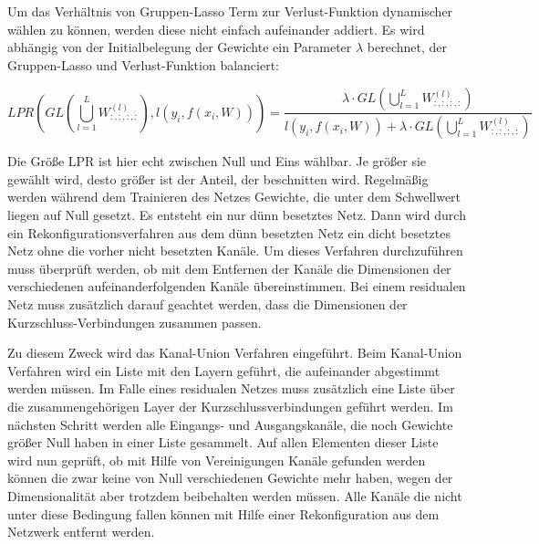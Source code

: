 Um das Verhältnis von Gruppen-Lasso Term zur Verlust-Funktion dynamischer wählen zu können, werden diese nicht einfach aufeinander addiert. Es wird abhängig von der Initialbelegung der Gewichte ein Parameter $\lambda$  berechnet, der Gruppen-Lasso und Verlust-Funktion balanciert:

\begin{equation}
 LPR(GL(\bigcup_{l=1}^{L} W_{:,:,:,:}^{(l)}),l(y_i,f(x_i,W))) = \frac{\lambda \cdot GL(\bigcup_{l=1}^{L} W_{:,:,:,:}^{(l)})}{l(y_i,f(x_i,W)) + \lambda \cdot GL(\bigcup_{l=1}^{L} W_{:,:,:,:}^{(l)})}           
\end{equation}

Die Größe LPR ist hier echt zwischen Null und Eins wählbar. Je größer sie gewählt wird, desto größer ist der Anteil, der beschnitten wird. Regelmäßig werden während dem Trainieren des Netzes Gewichte, die unter dem Schwellwert liegen auf Null gesetzt. Es entsteht ein nur dünn besetztes Netz. Dann wird durch ein Rekonfigurationsverfahren aus dem dünn besetzten Netz ein dicht besetztes Netz ohne die vorher nicht besetzten Kanäle. Um dieses Verfahren durchzuführen muss überprüft werden, ob mit dem Entfernen der Kanäle die Dimensionen der verschiedenen aufeinanderfolgenden Kanäle übereinstimmen. Bei einem residualen Netz muss zusätzlich darauf geachtet werden, dass die Dimensionen der Kurzschluss-Verbindungen zusammen passen.


Zu diesem Zweck wird das Kanal-Union Verfahren eingeführt. Beim Kanal-Union Verfahren wird ein Liste mit den Layern geführt, die aufeinander abgestimmt werden müssen. Im Falle eines residualen Netzes muss zusätzlich eine Liste über die zusammengehörigen Layer der Kurzschlussverbindungen geführt werden. Im nächsten Schritt werden alle Eingangs- und Ausgangskanäle, die noch Gewichte größer Null haben in einer Liste gesammelt. Auf allen Elementen dieser Liste wird nun geprüft, ob mit Hilfe von Vereinigungen Kanäle gefunden werden können die zwar keine von Null verschiedenen Gewichte mehr haben, wegen der Dimensionalität aber trotzdem beibehalten werden müssen. Alle Kanäle die nicht unter diese Bedingung fallen können mit Hilfe einer Rekonfiguration aus dem Netzwerk entfernt werden. 


